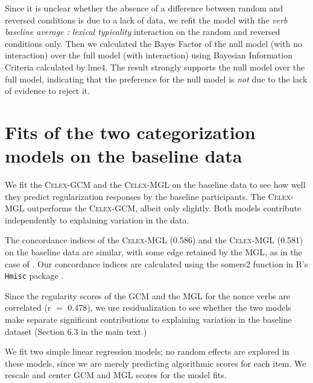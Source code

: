 \documentclass[12pt]{article}
\begin{document}
Since it is unclear whether the absence of a difference between random and reversed conditions is due to a lack of data, we refit the model with the {\em verb baseline average : lexical typicality} interaction on the random and reversed conditions only. Then we calculated the Bayes Factor of the null model (with no interaction) over the full model (with interaction) using Bayesian Information Criteria calculated by lme4. The result strongly supports the null model over the full model, indicating that the preference for the null model is {\em not} due to the lack of evidence to reject it.

\section{Fits of the two categorization models on the baseline data}\label{appendixgcmmglresidualization}

We fit the \textsc{Celex-GCM} and the \textsc{Celex-MGL} on the baseline data to see how well they predict regularization responses by the baseline participants. The \textsc{Celex-MGL} outperforms the \textsc{Celex-GCM}, albeit only slightly. Both models contribute independently to explaining variation in the data.


The concordance indices of the \textsc{Celex}-MGL (0.586) and the \textsc{Celex}-MGL (0.581) on the baseline data are similar, with some edge retained by the MGL, as in the case of \cite{albright2003rules}. Our concordance indices are calculated using the somers2 function in R's \texttt{Hmisc} package \citep{harrell2014hmisc}. 

Since the regularity scores of the GCM and the MGL for the nonce verbs are correlated  (r $=$ 0.478), we use residualization to see whether the two models make separate significant contributions to explaining variation in the baseline dataset (Section 6.3 in the main text.)

We fit two simple linear regression models; no random effects are explored in these models, since we are merely predicting algorithmic scores for each item. We rescale and center GCM and MGL scores for the model fits. 
\end{document}
